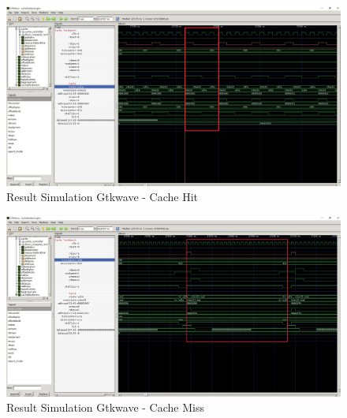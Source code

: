 \begin{figure}
	\centering
	\includegraphics[scale=.4]{pictures/simulationResultGTKWaveCacheHit}
	\caption{Result Simulation Gtkwave - Cache Hit}
	\label{fig:simulationResultCacheHit}
\end{figure}
\begin{figure}
	\centering
	\includegraphics[scale=.4]{pictures/simulationResultGTKWaveCacheMiss}
	\caption{Result Simulation Gtkwave - Cache Miss}
	\label{fig:simulationResultCacheMiss}
\end{figure}

